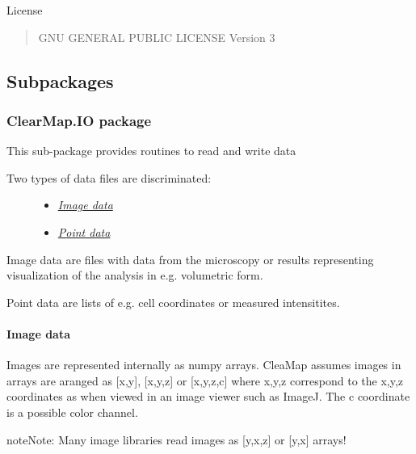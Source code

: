 \documentclass[letterpaper,10pt,english]{sphinxmanual}
\begin{document}
License
\begin{quote}

GNU GENERAL PUBLIC LICENSE Version 3
\end{quote}


\subsection{Subpackages}
\label{api/ClearMap:subpackages}

\subsubsection{ClearMap.IO package}
\label{api/ClearMap.IO:clearmap-io-package}\label{api/ClearMap.IO::doc}\label{api/ClearMap.IO:module-ClearMap.IO}
This sub-package provides routines to read and write data
\begin{description}
\item[{Two types of data files are discriminated:}] \leavevmode\begin{itemize}
\item {} 
{\hyperref[api/ClearMap.IO:image-data]{\emph{Image data}}}

\item {} 
{\hyperref[api/ClearMap.IO:point-data]{\emph{Point data}}}

\end{itemize}

\end{description}

Image data are files with data from the microscopy or results representing
visualization of the analysis in e.g. volumetric form.

Point data are lists of e.g. cell coordinates or measured
intensitites.


\paragraph{Image data}
\label{api/ClearMap.IO:image-data}
Images are represented internally as numpy arrays. CleaMap assumes images
in arrays are aranged as {[}x,y{]}, {[}x,y,z{]} or {[}x,y,z,c{]} where x,y,z correspond to
the x,y,z coordinates as when viewed in an image viewer such as ImageJ.
The c coordinate is a possible color channel.

\begin{notice}{note}{Note:}
Many image libraries read images as {[}y,x,z{]} or {[}y,x{]} arrays!
\end{notice}
\end{document}
